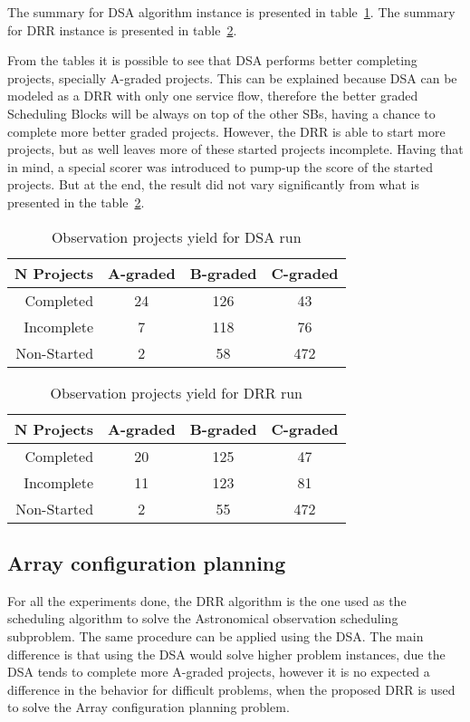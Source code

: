 The summary for DSA algorithm instance is presented in table~\ref{table:dsa-run-summary}. The summary for DRR instance is presented in table~\ref{table:drr-run-summary}.

From the tables it is possible to see that DSA performs better completing projects, specially A-graded projects. This can be explained because DSA can be modeled as a DRR with only one service flow, therefore the better graded Scheduling Blocks will be always on top of the other SBs, having a chance to complete more better graded projects. However, the DRR is able to start more projects, but as well leaves more of these started projects incomplete. Having that in mind, a special scorer was introduced to pump-up the score of the started projects. But at the end, the result did not vary significantly from what is presented in the table~\ref{table:drr-run-summary}.

\begin{table}[t!]
\centering
\begin{tabular}{|r|c|c|c|} \hline
 \textbf{N Projects} & \textbf{A-graded} & \textbf{B-graded} & \textbf{C-graded} \\ \hline
 Completed & 24 & 126 & 43 \\ \hline
 Incomplete & 7 & 118 & 76 \\ \hline
 Non-Started & 2 & 58 & 472 \\ \hline
\end{tabular}
\caption{Observation projects yield for DSA run}
\label{table:dsa-run-summary}
\end{table}

\begin{table}[t!]
\centering
\begin{tabular}{|r|c|c|c|} \hline
 \textbf{N Projects} & \textbf{A-graded} & \textbf{B-graded} & \textbf{C-graded} \\ \hline
 Completed & 20 & 125 & 47 \\ \hline
 Incomplete & 11 & 123 & 81 \\ \hline
 Non-Started & 2 & 55 & 472 \\ \hline
\end{tabular}
\caption{Observation projects yield for DRR run}
\label{table:drr-run-summary}
\end{table}

\subsection{Array configuration planning}
For all the experiments done, the DRR algorithm is the one used as the scheduling algorithm to solve the Astronomical observation scheduling subproblem. The same procedure can be applied using the DSA. The main difference is that using the DSA would solve higher problem instances, due the DSA tends to complete more A-graded projects, however it is no expected a difference in the behavior for difficult problems, when the proposed DRR is used to solve the Array configuration planning problem.   

